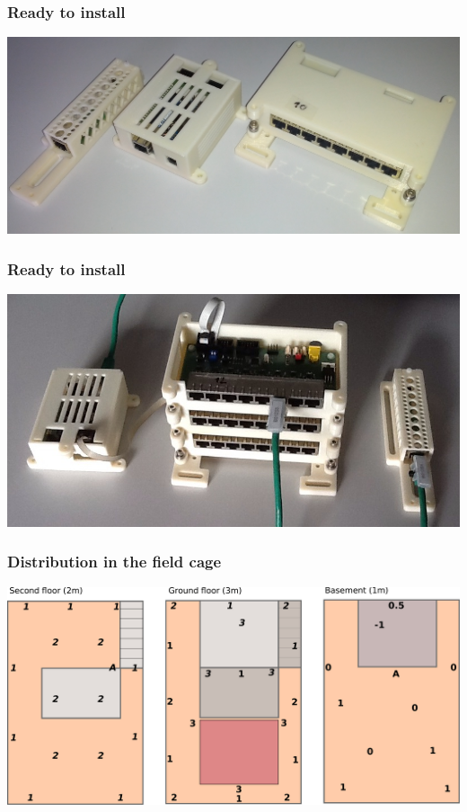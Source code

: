 \documentclass[t]{beamer}
\begin{document}
\begin{frame}[c]
    \frametitle{Ready to install}
  \begin{center}
  	\includegraphics[width=0.9\linewidth]{img/pic/cases.jpg}\\
  \vspace{0.5cm}
  \end{center}
\end{frame}
\begin{frame}[c]
    \frametitle{Ready to install}
  \begin{center}
  	\includegraphics[width=0.9\linewidth]{img/set.jpg}\\
  \vspace{0.5cm}
  \end{center}
\end{frame}
\begin{frame}[c]
    \frametitle{Distribution in the field cage}
  \begin{center}
  	\includegraphics[width=0.9\linewidth]{img/installPlan.pdf}\\
  \vspace{0.5cm}
  \end{center}
\end{frame}
\end{document}
